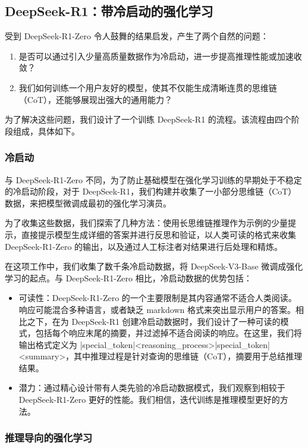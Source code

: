 \documentclass[lang=cn,a4paper,newtx]{elegantpaper}
\newcommand{\dsri}{DeepSeek-R1}
\newcommand{\dsro}{DeepSeek-R1-Zero}
\begin{document}
\subsection{\dsri{}：带冷启动的强化学习}

受到 \dsro{} 令人鼓舞的结果启发，产生了两个自然的问题：

\begin{enumerate}
  \item 是否可以通过引入少量高质量数据作为冷启动，进一步提高推理性能或加速收敛？
  \item 我们如何训练一个用户友好的模型，使其不仅能生成清晰连贯的思维链（CoT），还能够展现出强大的通用能力？
\end{enumerate}

为了解决这些问题，我们设计了一个训练 \dsri{} 的流程。该流程由四个阶段组成，具体如下。

\subsubsection{冷启动}

与 \dsro{} 不同，为了防止基础模型在强化学习训练的早期处于不稳定的冷启动阶段，对于 DeepSeek-R1，我们构建并收集了一小部分思维链（CoT）数据，来把模型微调成最初的强化学习演员。

为了收集这些数据，我们探索了几种方法：使用长思维链推理作为示例的少量提示，直接提示模型生成详细的答案并进行反思和验证，以人类可读的格式来收集 \dsro{} 的输出，以及通过人工标注者对结果进行后处理和精炼。

在这项工作中，我们收集了数千条冷启动数据，将 DeepSeek-V3-Base 微调成强化学习的起点。与 \dsro{} 相比，冷启动数据的优势包括：

\begin{itemize}[topsep=0pt]
  \item 可读性：\dsro{} 的一个主要限制是其内容通常不适合人类阅读。响应可能混合多种语言，或者缺乏 markdown 格式来突出显示用户的答案。相比之下，在为 \dsri{} 创建冷启动数据时，我们设计了一种可读的模式，包括每个响应末尾的摘要，并过滤掉不适合阅读的响应。在这里，我们将输出格式定义为 |special\_token|<reasoning\_process>|special\_token|<summary>，其中推理过程是针对查询的思维链（CoT），摘要用于总结推理结果。
  \item 潜力：通过精心设计带有人类先验的冷启动数据模式，我们观察到相较于 \dsro{} 更好的性能。我们相信，迭代训练是推理模型更好的方法。
\end{itemize}

\subsubsection{推理导向的强化学习}
\end{document}
